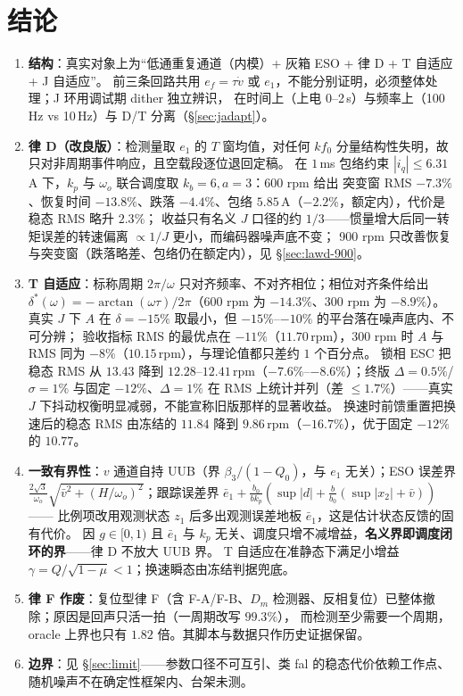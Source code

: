 \documentclass[11pt,a4paper]{article}
\theoremstyle{remark}\newtheorem{remark}{注}
\begin{document}
\section{结论}\label{sec:concl}
\begin{enumerate}
  \item \textbf{结构}：真实对象上为“低通重复通道（内模）+ 灰箱 ESO + 律 D + T 自适应 + J 自适应”。
        前三条回路共用 $e_f=\tau\dot v$ 或 $e_1$，不能分别证明，必须整体处理；J 环用调试期 dither 独立辨识，
        在时间上（上电 0--2\,s）与频率上（100\,Hz vs 10\,Hz）与 D/T 分离（\S\ref{sec:jadapt}）。
  \item \textbf{律 D（改良版）}：检测量取 $e_1$ 的 $T$ 窗均值，对任何 $k f_0$ 分量结构性失明，故只对非周期事件响应，且空载段逐位退回定稿。
        在 $1$\,ms 包络约束 $|i_q|\le6.31$\,A 下，$k_p$ 与 $\omega_o$ 联合调度取 $k_b=6,a=3$：600 rpm 给出
        突变窗 RMS $-7.3\%$、恢复时间 $-13.8\%$、跌落 $-4.4\%$、包络 $5.85$\,A（$-2.2\%$，额定内），代价是稳态 RMS 略升 $2.3\%$；
        收益只有名义 $J$ 口径的约 $1/3$——惯量增大后同一转矩误差的转速偏离 $\propto1/J$ 更小，而编码器噪声底不变；
        900 rpm 只改善恢复与突变窗（跌落略差、包络仍在额定内），见 §\ref{sec:lawd-900}。
  \item \textbf{T 自适应}：标称周期 $2\pi/\omega$ 只对齐频率、不对齐相位；相位对齐条件给出
        $\delta^{*}(\omega)=-\arctan(\omega\tau)/2\pi$（600 rpm 为 $-14.3\%$、300 rpm 为 $-8.9\%$）。
        真实 $J$ 下 $A$ 在 $\delta=-15\%$ 取最小，但 $-15\%$--$-10\%$ 的平台落在噪声底内、不可分辨；
        验收指标 RMS 的最优点在 $-11\%$（$11.70$\,rpm），300 rpm 时 $A$ 与 RMS 同为 $-8\%$（$10.15$\,rpm），与理论值都只差约 $1$ 个百分点。
        锁相 ESC 把稳态 RMS 从 $13.43$ 降到 $12.28$--$12.41$\,rpm（$-7.6\%$--$-8.6\%$）；终版 $\Delta=0.5\%$/\,$\sigma=1\%$
        与固定 $-12\%$、$\Delta=1\%$ 在 RMS 上统计并列（差 $\le1.7\%$）——真实 $J$ 下抖动权衡明显减弱，不能宣称旧版那样的显著收益。
        换速时前馈重置把换速后的稳态 RMS 由冻结的 $11.84$ 降到 $9.86$\,rpm（$-16.7\%$），优于固定 $-12\%$ 的 $10.77$。
  \item \textbf{一致有界性}：$v$ 通道自持 UUB（界 $\beta_3/(1-Q_0)$，与 $e_1$ 无关）；ESO 误差界
        $\frac{2\sqrt3}{\omega_o}\sqrt{\bar v^{2}+(H/\omega_o)^{2}}$；跟踪误差界
        $\bar e_1+\frac{b_0}{bk_p}(\sup|d|+\frac{b}{b_0}(\sup|x_2|+\bar v))$——
        比例项改用观测状态 $z_1$ 后多出观测误差地板 $\bar e_1$，这是估计状态反馈的固有代价。
        因 $g\in[0,1)$ 且 $\bar e_1$ 与 $k_p$ 无关、调度只增不减增益，\textbf{名义界即调度闭环的界}——律 D 不放大 UUB 界。
        T 自适应在准静态下满足小增益 $\gamma=Q/\sqrt{1-\mu}<1$；换速瞬态由冻结判据兜底。
  \item \textbf{律 F 作废}：复位型律 F（含 F-A/F-B、$D_m$ 检测器、反相复位）已整体撤除；原因是回声只活一拍（一周期改写 $99.3\%$），
        而检测至少需要一个周期，oracle 上界也只有 $1.82$ 倍。其脚本与数据只作历史证据保留。
  \item \textbf{边界}：见 §\ref{sec:limit}——参数口径不可互引、类 fal 的稳态代价依赖工作点、随机噪声不在确定性框架内、台架未测。
\end{enumerate}
\end{document}
